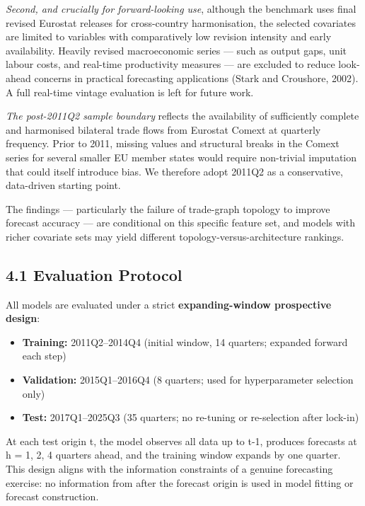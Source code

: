 \documentclass[
]{article}
\providecommand{\tightlist}{%
  \setlength{\itemsep}{0pt}\setlength{\parskip}{0pt}}
\begin{document}
\emph{Second, and crucially for forward-looking use}, although the benchmark uses final revised Eurostat releases for cross-country harmonisation, the selected covariates are limited to variables with comparatively low revision intensity and early availability. Heavily revised macroeconomic series --- such as output gaps, unit labour costs, and real-time productivity measures --- are excluded to reduce look-ahead concerns in practical forecasting applications (Stark and Croushore, 2002). A full real-time vintage evaluation is left for future work.

\emph{The post-2011Q2 sample boundary} reflects the availability of sufficiently complete and harmonised bilateral trade flows from Eurostat Comext at quarterly frequency. Prior to 2011, missing values and structural breaks in the Comext series for several smaller EU member states would require non-trivial imputation that could itself introduce bias. We therefore adopt 2011Q2 as a conservative, data-driven starting point.

The findings --- particularly the failure of trade-graph topology to improve forecast accuracy --- are conditional on this specific feature set, and models with richer covariate sets may yield different topology-versus-architecture rankings.

\subsection{4.1 Evaluation Protocol}\label{evaluation-protocol}

All models are evaluated under a strict \textbf{expanding-window
prospective design}:

\begin{itemize}
\tightlist
\item
  \textbf{Training:} 2011Q2--2014Q4 (initial window, 14 quarters;
  expanded forward each step)
\item
  \textbf{Validation:} 2015Q1--2016Q4 (8 quarters; used for
  hyperparameter selection only)
\item
  \textbf{Test:} 2017Q1--2025Q3 (35 quarters; no re-tuning or
  re-selection after lock-in)
\end{itemize}

At each test origin t, the model observes all data up to t-1, produces
forecasts at h = 1, 2, 4 quarters ahead, and the training window expands
by one quarter. This design aligns with the information constraints of a
genuine forecasting exercise: no information from after the forecast origin
is used in model fitting or forecast construction.
\end{document}

